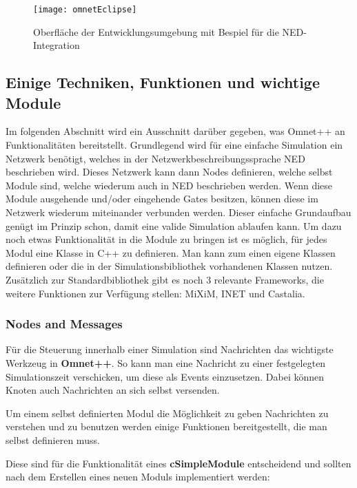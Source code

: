 \begin{figure}[htbp]
\centering
\caption{Oberfläche der Entwicklungsumgebung mit Bespiel für die NED-Integration}
\label{fig:messageEvent}
\texttt{[image: omnetEclipse]}
\end{figure}

\subsection{Einige Techniken, Funktionen und wichtige Module}

Im folgenden Abschnitt wird ein Ausschnitt darüber gegeben, was Omnet++ an Funktionalitäten bereitstellt. Grundlegend wird für eine einfache Simulation ein Netzwerk benötigt, welches in der Netzwerkbeschreibungssprache NED beschrieben wird. Dieses Netzwerk kann dann Nodes definieren, welche selbst Module sind, welche wiederum auch in NED beschrieben werden. Wenn diese Module ausgehende und/oder eingehende Gates besitzen, können diese im Netzwerk wiederum miteinander verbunden werden.\newline
Dieser einfache Grundaufbau genügt im Prinzip schon, damit eine valide Simulation ablaufen kann. Um dazu noch etwas Funktionalität in die Module zu bringen ist es möglich, für jedes Modul eine Klasse in C++ zu definieren. Man kann zum einen eigene Klassen definieren oder die in der Simulationsbibliothek vorhandenen Klassen nutzen.\newline
Zusätzlich zur Standardbibliothek gibt es noch 3 relevante Frameworks, die weitere Funktionen zur Verfügung stellen: MiXiM, INET und Castalia.

\subsubsection{Nodes and Messages}\label{para:Nodes and Messages}

Für die Steuerung innerhalb einer Simulation sind Nachrichten das wichtigste Werkzeug in \textbf{Omnet++}. So kann man eine Nachricht zu einer festgelegten Simulationszeit verschicken, um diese als Events einzusetzen. Dabei können Knoten auch Nachrichten an sich selbst versenden.

Um einem selbst definierten Modul die Möglichkeit zu geben Nachrichten zu verstehen und zu benutzen werden einige Funktionen bereitgestellt, die man selbst definieren muss.

Diese sind für die Funktionalität eines \textbf{cSimpleModule} entscheidend und sollten nach dem Erstellen eines neuen Moduls implementiert werden:


